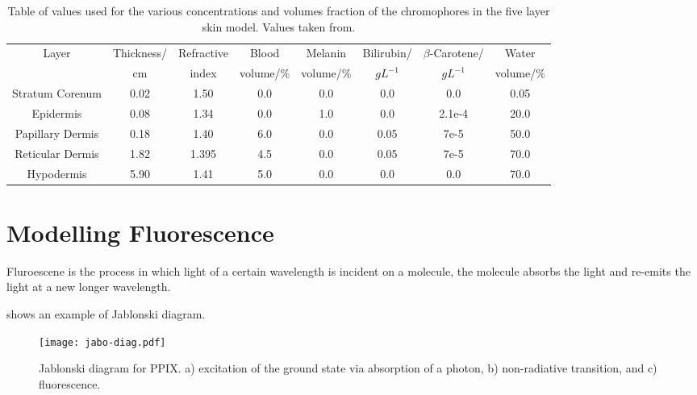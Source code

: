 \begin{table}[tb] 
  \centering

  \begin{tabular}{|c|c|c|c|c|c|c|c|}
  \hline
  Layer & Thickness/ & Refractive & Blood & Melanin & Bilirubin/ & $\beta$-Carotene/ & Water\\
    &cm & index & volume/\% & volume/\% & $gL^{-1}$ & $gL^{-1}$ & volume/\%\\
  \hline
  Stratum Corenum  & 0.02 & 1.50  & 0.0 & 0.0 & 0.0  & 0.0 & 0.05\\
  Epidermis        & 0.08 & 1.34  & 0.0 & 1.0 & 0.0  & 2.1e-4 & 20.0\\
  Papillary Dermis & 0.18 & 1.40  & 6.0 & 0.0 & 0.05 & 7e-5 & 50.0\\
  Reticular Dermis & 1.82 & 1.395 & 4.5 & 0.0 & 0.05 & 7e-5 & 70.0\\
  Hypodermis       & 5.90 & 1.41  & 5.0 & 0.0 & 0.0  & 0.0 & 70.0\\

  \hline
  \end{tabular}
    \caption{Table of values used for the various concentrations and volumes fraction of the chromophores in the five layer skin model. Values taken from\cite{krishnaswamy2004biophysically,meglinski2002quantitative,campbell20153d,iglesias2015biophysically}.}
  \label{tab:optpropsvals}
\end{table}


\FloatBarrier

\section{Modelling Fluorescence}

Fluroescene is the process in which light of a certain wavelength is incident on a molecule, the molecule absorbs the light and re-emits the light at a new longer wavelength.

 shows an example of Jablonski diagram.

\begin{figure}[!htpb]
	\centering
	\texttt{[image: jabo-diag.pdf]}
	\caption{Jablonski diagram for PPIX. a) excitation of the ground state via absorption of a photon, b) non-radiative transition, and c) fluorescence.}
	\label{fig:Jabo}
\end{figure}

